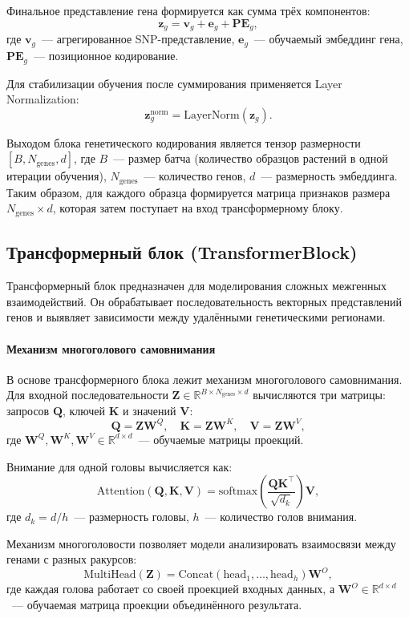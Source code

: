 Финальное представление гена формируется как сумма трёх компонентов:
\[
\mathbf{z}_g = \mathbf{v}_g + \mathbf{e}_g + \mathbf{PE}_g,
\]
где $\mathbf{v}_g$~--- агрегированное SNP-представление, $\mathbf{e}_g$~--- 
обучаемый эмбеддинг гена, $\mathbf{PE}_g$~--- позиционное кодирование.

Для стабилизации обучения после суммирования применяется Layer Normalization:
\[
\mathbf{z}_g^{\text{norm}} = \text{LayerNorm}(\mathbf{z}_g).
\]

Выходом блока генетического кодирования является тензор размерности 
$[B, N_{\text{genes}}, d]$, где $B$~--- размер батча (количество образцов 
растений в одной итерации обучения), $N_{\text{genes}}$~--- количество 
генов, $d$~--- размерность эмбеддинга. Таким образом, для каждого образца 
формируется матрица признаков размера $N_{\text{genes}} \times d$, которая 
затем поступает на вход трансформерному блоку.

\subsection{Трансформерный блок (TransformerBlock)}

Трансформерный блок предназначен для моделирования сложных межгенных 
взаимодействий. Он обрабатывает последовательность векторных представлений 
генов и выявляет зависимости между удалёнными генетическими регионами.

\paragraph{Механизм многоголового самовнимания}

В основе трансформерного блока лежит механизм многоголового самовнимания.\cite{Vaswani2017} Для входной последовательности $\mathbf{Z} \in \mathbb{R}^{B \times N_{\text{genes}} \times d}$ 
вычисляются три матрицы: запросов $\mathbf{Q}$, ключей $\mathbf{K}$ и 
значений $\mathbf{V}$:
\[
\mathbf{Q} = \mathbf{Z} \mathbf{W}^Q, \quad
\mathbf{K} = \mathbf{Z} \mathbf{W}^K, \quad
\mathbf{V} = \mathbf{Z} \mathbf{W}^V,
\]
где $\mathbf{W}^Q, \mathbf{W}^K, \mathbf{W}^V \in \mathbb{R}^{d \times d}$~--- 
обучаемые матрицы проекций.

Внимание для одной головы вычисляется как:
\[
\text{Attention}(\mathbf{Q}, \mathbf{K}, \mathbf{V}) = 
\text{softmax}\left(\frac{\mathbf{Q} \mathbf{K}^\top}{\sqrt{d_k}}\right) \mathbf{V},
\]
где $d_k = d/h$~--- размерность головы, $h$~--- количество голов внимания.

Механизм многоголовости позволяет модели анализировать взаимосвязи между 
генами с разных ракурсов:
\[
\text{MultiHead}(\mathbf{Z}) = \text{Concat}(\text{head}_1, \dots, \text{head}_h) \mathbf{W}^O,
\]
где каждая голова работает со своей проекцией входных данных, а 
$\mathbf{W}^O \in \mathbb{R}^{d \times d}$~--- обучаемая матрица проекции 
объединённого результата.

